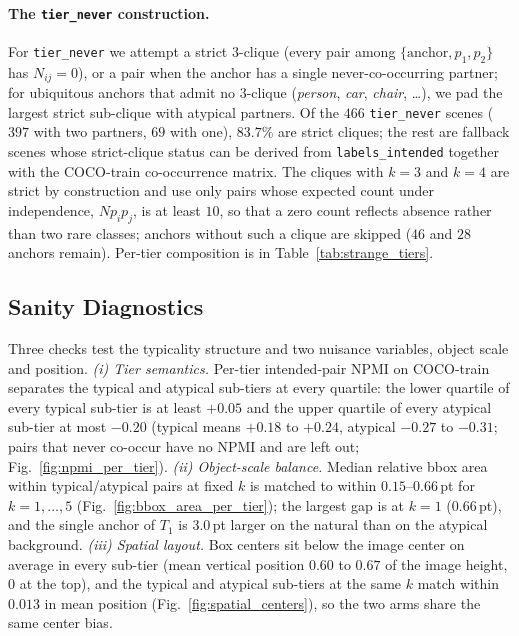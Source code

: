 \paragraph{The \texttt{tier\_never} construction.}
For \texttt{tier\_never} we attempt a strict $3$-clique (every pair among $\{\text{anchor}, p_1, p_2\}$ has $N_{ij}\!=\!0$), or a pair when the anchor has a single never-co-occurring partner; for ubiquitous anchors that admit no $3$-clique (\emph{person}, \emph{car}, \emph{chair}, \dots), we pad the largest strict sub-clique with atypical partners. Of the $466$ \texttt{tier\_never} scenes ($397$ with two partners, $69$ with one), $83.7\%$ are strict cliques; the rest are fallback scenes whose strict-clique status can be derived from \texttt{labels\_intended} together with the COCO-train co-occurrence matrix. The cliques with $k\!=\!3$ and $k\!=\!4$ are strict by construction and use only pairs whose expected count under independence, $N p_i p_j$, is at least $10$, so that a zero count reflects absence rather than two rare classes; anchors without such a clique are skipped ($46$ and $28$ anchors remain). Per-tier composition is in Table~\ref{tab:strange_tiers}.



\subsection{Sanity Diagnostics}
\label{app:strange:diag}

Three checks test the typicality structure and two nuisance variables, object scale and position. \textit{(i) Tier semantics.} Per-tier intended-pair NPMI on COCO-train separates the typical and atypical sub-tiers at every quartile: the lower quartile of every typical sub-tier is at least $+0.05$ and the upper quartile of every atypical sub-tier at most $-0.20$ (typical means $+0.18$ to $+0.24$, atypical $-0.27$ to $-0.31$; pairs that never co-occur have no NPMI and are left out; Fig.~\ref{fig:npmi_per_tier}). \textit{(ii) Object-scale balance.} Median relative bbox area within typical/atypical pairs at fixed $k$ is matched to within $0.15$--$0.66$\,pt for $k\!=\!1,\dots,5$ (Fig.~\ref{fig:bbox_area_per_tier}); the largest gap is at $k\!=\!1$ ($0.66$\,pt), and the single anchor of $T_1$ is $3.0$\,pt larger on the natural than on the atypical background. \textit{(iii) Spatial layout.} Box centers sit below the image center on average in every sub-tier (mean vertical position $0.60$ to $0.67$ of the image height, $0$ at the top), and the typical and atypical sub-tiers at the same $k$ match within $0.013$ in mean position (Fig.~\ref{fig:spatial_centers}), so the two arms share the same center bias.

